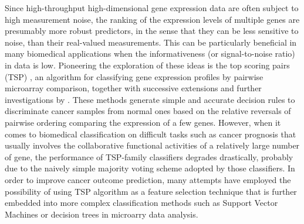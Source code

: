 Since high-throughput high-dimensional gene expression data are often subject to high measurement noise, the ranking of the expression levels of multiple genes are presumably more robust predictors, in the sense that they can be less sensitive to noise, than their real-valued measurements. This can be particularly beneficial in many biomedical applications when the informativeness (or signal-to-noise ratio) in data is low. Pioneering the exploration of these ideas is the top scoring pairs (TSP) \cite{Geman2004Classifying}, an algorithm for classifying gene expression profiles by pairwise microarray comparison, together with successive extensions and further investigations by \cite{Tan2005Simple, Xu2005Robust, Lin2009ordering}. These methods generate simple and accurate decision rules to discriminate cancer samples from normal ones based on the relative reversals of pairwise ordering comparing the expression of a few genes. However, when it comes to biomedical classification on difficult tasks such as cancer prognosis that usually involves the collaborative functional activities of a relatively large number of gene, the performance of TSP-family classifiers degrades drastically, probably due to the naively simple majority voting scheme adopted by those classifiers. In order to improve cancer outcome prediction, many attempts have employed the possibility of using TSP algorithm as a feature selection technique that is further embedded into more complex classification methods such as Support Vector Machines \cite{Shi2011Top} or decision trees \cite{Czajkowski2011Top} in microarry data analysis.


